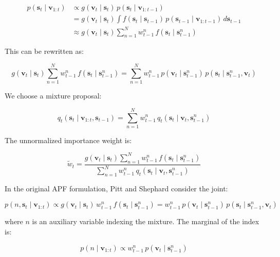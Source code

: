 \documentclass[11pt,a4paper]{article}
\begin{document}
\begin{align}
p(\mathbf{s}_t \mid \mathbf{v}_{1:t}) &\propto g(\mathbf{v}_t \mid \mathbf{s}_t) \, p(\mathbf{s}_t \mid \mathbf{v}_{1:t-1}) \nonumber \\
&= g(\mathbf{v}_t \mid \mathbf{s}_t) \int f(\mathbf{s}_t \mid \mathbf{s}_{t-1}) \, p(\mathbf{s}_{t-1} \mid \mathbf{v}_{1:t-1}) \, d\mathbf{s}_{t-1} \nonumber \\
&\approx g(\mathbf{v}_t \mid \mathbf{s}_t) \sum_{n=1}^{N} w_{t-1}^n \, f(\mathbf{s}_t \mid \mathbf{s}_{t-1}^n)
\end{align}

This can be rewritten as:

\begin{equation}
g(\mathbf{v}_t \mid \mathbf{s}_t) \sum_{n=1}^{N} w_{t-1}^n \, f(\mathbf{s}_t \mid \mathbf{s}_{t-1}^n) = \sum_{n=1}^{N} w_{t-1}^n \, p(\mathbf{v}_t \mid \mathbf{s}_{t-1}^n) \, p(\mathbf{s}_t \mid \mathbf{s}_{t-1}^n, \mathbf{v}_t)
\end{equation}

We choose a mixture proposal:

\begin{equation}
q_t(\mathbf{s}_t \mid \mathbf{v}_{1:t}, \mathbf{s}_{t-1}) = \sum_{n=1}^{N} w_{t-1}^n \, q_t(\mathbf{s}_t \mid \mathbf{v}_t, \mathbf{s}_{t-1}^n)
\end{equation}

The unnormalized importance weight is:

\begin{equation}
\widetilde{w}_t = \frac{g(\mathbf{v}_t \mid \mathbf{s}_t) \sum_{n=1}^{N} w_{t-1}^n \, f(\mathbf{s}_t \mid \mathbf{s}_{t-1}^n)}{\sum_{n=1}^{N} w_{t-1}^n \, q_t(\mathbf{s}_t \mid \mathbf{v}_t, \mathbf{s}_{t-1}^n)}
\end{equation}

In the original APF formulation, Pitt and Shephard consider the joint:

\begin{equation}
p(n, \mathbf{s}_t \mid \mathbf{v}_{1:t}) \propto g(\mathbf{v}_t \mid \mathbf{s}_t) \, w_{t-1}^n \, f(\mathbf{s}_t \mid \mathbf{s}_{t-1}^n) = w_{t-1}^n \, p(\mathbf{v}_t \mid \mathbf{s}_{t-1}^n) \, p(\mathbf{s}_t \mid \mathbf{s}_{t-1}^n, \mathbf{v}_t)
\end{equation}

where $n$ is an auxiliary variable indexing the mixture. The marginal of the index is:

\begin{equation}
p(n \mid \mathbf{v}_{1:t}) \propto w_{t-1}^n \, p(\mathbf{v}_t \mid \mathbf{s}_{t-1}^n)
\end{equation}
\end{document}
